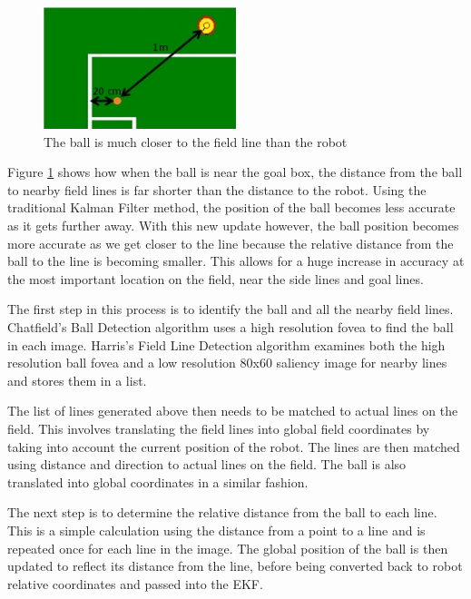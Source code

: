 \documentclass[runningheads,a4paper]{llncs}
\begin{document}
\begin{figure}[h!]
  \centering
    \includegraphics[width=0.5\textwidth]{figures/BallDemo.jpg}
  \caption{The ball is much closer to the field line than the robot}
 \label{fig:balldemo}
\end{figure}

Figure \ref{fig:balldemo} shows how when the ball is near the goal box, the distance from the ball to nearby field lines is far shorter than the distance to the robot. Using the traditional Kalman Filter method, the position of the ball becomes less accurate as it gets further away. With this new update however, the ball position becomes more accurate as we get closer to the line because the relative distance from the ball to the line is becoming smaller. This allows for a huge increase in accuracy at the most important location on the field, near the side lines and goal lines.

The first step in this process is to identify the ball and all the nearby field lines. Chatfield's\cite{chatfield} Ball Detection algorithm uses a high resolution fovea to find the ball in each image. Harris's\cite{harris} Field Line Detection algorithm examines both the high resolution ball fovea and a low resolution 80x60 saliency image for nearby lines and stores them in a list.

The list of lines generated above then needs to be matched to actual lines on the field. This involves translating the field lines into global field coordinates by taking into account the current position of the robot. The lines are then matched using distance and direction to actual lines on the field. The ball is also translated into global coordinates in a similar fashion.

The next step is to determine the relative distance from the ball to each line. This is a simple calculation using the distance from a point to a line and is repeated once for each line in the image. The global position of the ball is then updated to reflect its distance from the line, before being converted back to robot relative coordinates and passed into the EKF.
\end{document}
